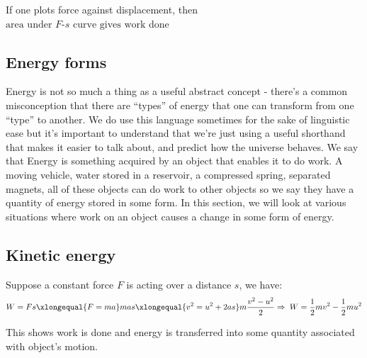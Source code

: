 \documentclass[a4paper,12pt]{book}
\renewenvironment{marginfigure}[1][]{\begin{figure}[htbp]\centering}{\end{figure}}
\newcommand{\RA}{\Rightarrow\;}
\begin{document}
If one plots force against displacement, then $\boxed{\text{area under $F$-$s$ curve gives work done}}$

\begin{marginfigure}
	\vspace*{-12pt}
	\centering
	\vspace*{-16pt}
\end{marginfigure}

	

\subsection{Energy forms}\label{ch-KE}

Energy is not so much a thing as a useful abstract concept - there's a common misconception that there are ``types'' of energy that one can transform from one ``type'' to another. We do use this language sometimes for the sake of linguistic ease but it's important to understand that we're just using a useful shorthand that makes it easier to talk about, and predict how the universe behaves. We say that Energy is something acquired by an object that enables it to do work. A moving vehicle, water stored in a reservoir, a compressed spring, separated magnets, all of these objects can do work to other objects so we say they have a quantity of energy stored in some form. In this section, we will look at various situations where work on an object causes a change in some form of energy.

\subsection{Kinetic energy}

Suppose a constant force $F$ is acting over a distance $s$, we have:
\begin{equation*}
	W=Fs \xlongequal{F=ma} mas \xlongequal{v^2 = u^2 + 2as} m \frac{v^2-u^2}{2} \RA W = \frac{1}{2}mv^2 - \frac{1}{2}mu^2
\end{equation*}

This shows work is done and energy is transferred into some quantity associated with object's motion. 
\end{document}
